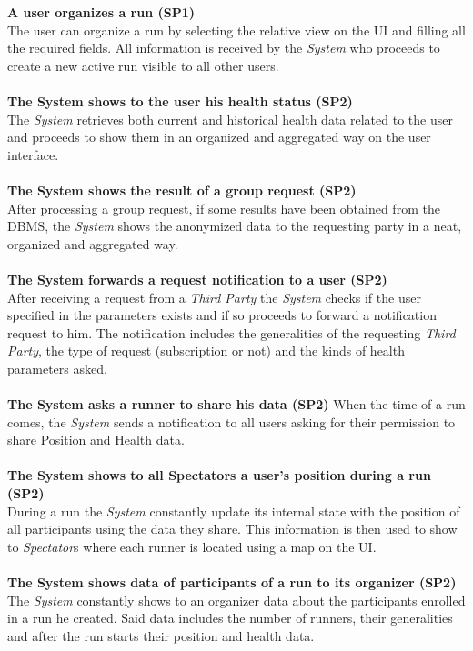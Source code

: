 \documentclass[titlepage]{article}
\begin{document}
{\bf A user organizes a run (SP1)}\\
The user can organize a run by selecting the relative view on the UI and filling all the required fields. All information is received by the {\it System} who proceeds to create a new active run visible to all other users.\\ \\
{\bf The System shows to the user his health status (SP2)} \\
The {\it System} retrieves both current and historical health data related to the user and proceeds to show them in an organized and aggregated way on the user interface.\\ \\
{\bf The System shows the result of a group request (SP2)} \\
After processing a group request, if some results have been obtained from the DBMS, the {\it System} shows the anonymized data to the requesting party in a neat, organized and aggregated way.\\ \\
{\bf The System forwards a request notification to a user (SP2)} \\
After receiving a request from a {\it Third Party} the {\it System} checks if the user specified in the parameters exists and if so proceeds to forward a notification request to him. The notification includes the generalities of the requesting {\it Third Party}, the type of request (subscription or not) and the kinds of health parameters asked.\\ \\
{\bf The System asks a runner to share his data (SP2)}
When the time of a run comes, the {\it System} sends a notification to all users asking for their permission to share Position and Health data.\\ \\
{\bf The System shows to all Spectators a user’s position during a run (SP2)} \\
During a run the {\it System} constantly update its internal state with the position of all participants using the data they share. This information is then used to show to {\it Spectator}s where each runner is located using a map on the UI.\\ \\
{\bf The System shows data of participants of a run to its organizer (SP2)} \\
The {\it System} constantly shows to an organizer data about the participants enrolled in a run he created. Said data includes the number of runners, their generalities and after the run starts their position and health data. \\ \\
\end{document}
